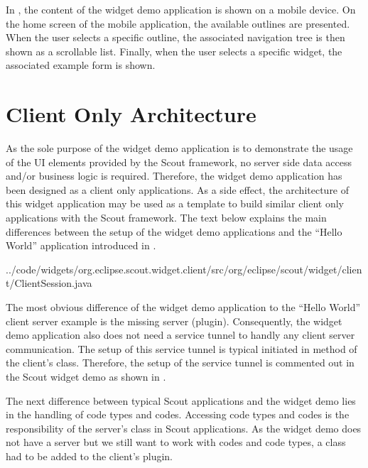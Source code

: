\documentclass[a4paper,10pt,twoside]{book}
\begin{document}
{In , the content of the widget demo application is shown on a mobile device. 
On the home screen of the mobile application, the available outlines are presented. 
When the user selects a specific outline, the associated navigation tree is then shown as a scrollable list. 
Finally, when the user selects a specific widget, the associated example form is shown. 

\section{Client Only Architecture}

As the sole purpose of the widget demo application is to demonstrate the usage of the UI elements provided by the Scout framework, no server side data access and/or business logic is required. 
Therefore, the widget demo application has been designed as a client only applications. 
As a side effect, the architecture of this widget application may be used as a template to build similar client only applications with the Scout framework. 
The text below explains the main differences between the setup of the widget demo applications and the ``Hello World'' application introduced in .


{../code/widgets/org.eclipse.scout.widget.client/src/org/eclipse/scout/widget/client/ClientSession.java}

The most obvious difference of the widget demo application to the ``Hello World'' client server example is the missing server (plugin). 
Consequently, the widget demo application also does not need a service tunnel to handly any client server communication.
The setup of this service tunnel is typical initiated in method  of the client's  class. 
Therefore, the setup of the service tunnel is commented out in the Scout widget demo as shown in . 

The next difference between typical Scout applications and the widget demo lies in the handling of code types and codes. 
Accessing code types and codes is the responsibility of the server's  class in Scout applications. 
As the widget demo does not have a server but we still want to work with codes and code types, a  class had to be added to the client's plugin. 

}
\end{document}
